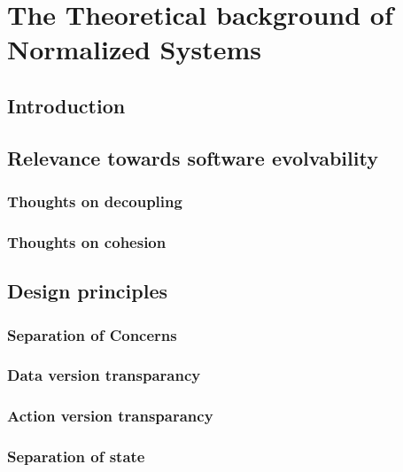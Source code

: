 \section{The Theoretical background of Normalized Systems}

\subsection{Introduction}
\lipsum[1-1]

\subsection{Relevance towards software evolvability}
\lipsum[1-1]

\subsubsection{Thoughts on decoupling}
\lipsum[1-1]

\subsubsection{Thoughts on cohesion}
\lipsum[1-1]

\subsection{Design principles}
\lipsum[1-1]

\subsubsection{Separation of Concerns}
\lipsum[1-1]

\subsubsection{Data version transparancy}
\lipsum[1-1]

\subsubsection{Action version transparancy}
\lipsum[1-1]

\subsubsection{Separation of state}
\lipsum[1-1]